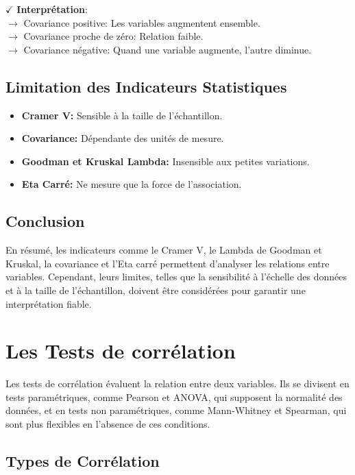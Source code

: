\textbf{\(\checkmark\)} \textbf{Interprétation}:\\
\noindent \textbf{\(\rightarrow\)} Covariance positive: Les variables augmentent ensemble.\\
\textbf{\(\rightarrow\)} Covariance proche de zéro: Relation faible.\\
\textbf{\(\rightarrow\)} Covariance négative: Quand une variable augmente, l'autre diminue.

\subsection{Limitation des Indicateurs Statistiques}

\begin{itemize}
    \item \textbf{Cramer V:} Sensible à la taille de l'échantillon.
    \item \textbf{Covariance:} Dépendante des unités de mesure.
    \item \textbf{Goodman et Kruskal Lambda:} Insensible aux petites variations.
    \item \textbf{Eta Carré:} Ne mesure que la force de l'association.
\end{itemize}

\subsection{Conclusion}

En résumé, les indicateurs comme le Cramer V, le Lambda de Goodman et Kruskal, la covariance et l'Eta carré permettent d'analyser les relations entre variables. Cependant, leurs limites, telles que la sensibilité à l'échelle des données et à la taille de l'échantillon, doivent être considérées pour garantir une interprétation fiable.

\section{Les Tests de corrélation}

 Les tests de corrélation évaluent la relation entre deux variables. Ils se divisent en tests paramétriques, comme Pearson \cite{pearson} et ANOVA, qui supposent la normalité des données, et en tests non paramétriques, comme Mann-Whitney \cite{U} et Spearman, qui sont plus flexibles en l'absence de ces conditions.

\subsection*{Types de Corrélation}

